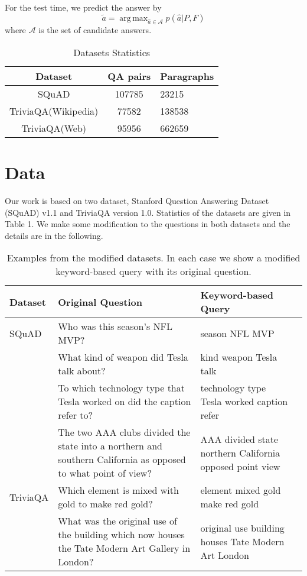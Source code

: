 \documentclass[sigconf]{acmart}
\DeclareMathOperator*{\argmax}{arg\,max}
\begin{document}
For the test time, we predict the answer by 
$$\tilde{a} =\argmax_{\hat{a} \in \mathcal{A}} p(\hat{a} | P,F) $$
where $\mathcal{A}$ is the set of candidate answers. 

\begin{table}
  \label{tab:commands}
  \begin{tabular}{ccl}
    \toprule
    \textbf{Dataset} &  \textbf{QA pairs} & \textbf{Paragraphs}\\
    \midrule
    SQuAD & 107785 & 23215 \\
    TriviaQA(Wikipedia) & 77582 & 138538\\ 
    TriviaQA(Web) & 95956 & 662659\\ 
    \bottomrule
  \end{tabular}
  \vspace{2mm}
  \caption{Datasets Statistics}       
\end{table}
 
\section{Data} 
Our work is based on two dataset, Stanford Question Answering Dataset (SQuAD) v1.1\cite{rajpurkar2016squad} and TriviaQA version 1.0\cite{joshi2017triviaqa}. Statistics of the datasets are given in Table 1. We make some modification to the questions in both datasets and the details are in the following.

\begin{table*}
    \label{tab:commands}
  \begin{tabular} {lp{8cm}p{7cm}p{7cm}}
    \toprule
    \textbf{Dataset} & \textbf{Original Question} & \textbf{Keyword-based Query}\\
    \midrule
    SQuAD & Who was this season's NFL MVP? & season NFL MVP \\
    &What kind of weapon did Tesla talk about? & kind weapon Tesla talk \\
    & To which technology type that Tesla worked on did the caption refer to? & technology type Tesla worked caption refer\\
    & The two AAA clubs divided the state into a northern and southern California as opposed to what point of view? & AAA divided state northern California opposed point view\\
     \midrule
   TriviaQA & Which element is mixed with gold to make red gold? &element mixed gold make red gold\\
   & What was the original use of the building which now houses the Tate Modern Art Gallery in London? & original use building houses Tate Modern Art London\\
    \bottomrule
  \end{tabular}
\vspace{2mm}
     \caption{Examples from the modified datasets. In each case we show a modified keyword-based query with its original question.}   
\end{table*}
\end{document}
